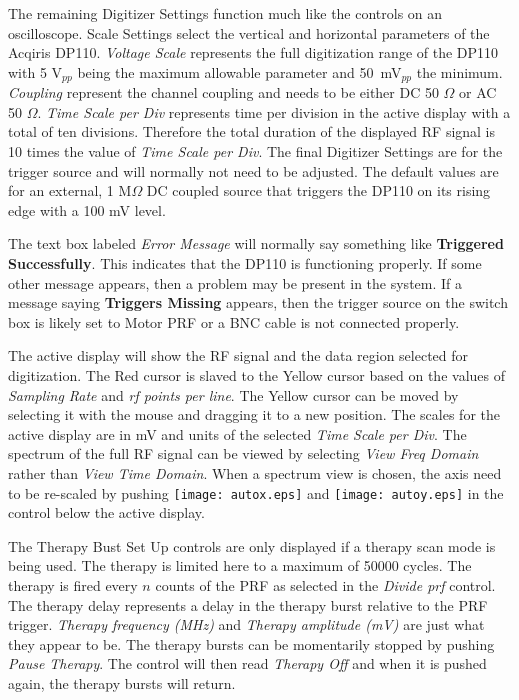 \documentclass[10pt]{article}
\begin{document}
The remaining Digitizer Settings function much like the controls
on an oscilloscope. Scale Settings select the vertical and
horizontal parameters of the Acqiris DP110. {\it Voltage Scale}
represents the full digitization range of the DP110 with 5
V$_{pp}$ being the maximum allowable parameter and 50~mV$_{pp}$
the minimum. {\it Coupling} represent the channel coupling and
needs to be either DC 50 $\Omega$ or AC 50 $\Omega$. {\it Time
Scale per Div} represents time per division in the active display
with a total of ten divisions. Therefore the total duration of the
displayed RF signal is 10 times the value of {\it Time Scale per
Div}. The final Digitizer Settings are for the trigger source and
will normally not need to be adjusted. The default values are for
an external, 1 M$\Omega$ DC coupled source that triggers the DP110
on its rising edge with a 100 mV level.

The text box labeled {\it Error Message} will normally say
something like {\bf Triggered Successfully}. This indicates that
the DP110 is functioning properly. If some other message appears,
then a problem may be present in the system. If a message saying
{\bf Triggers Missing} appears, then the trigger source on the
switch box is likely set to Motor PRF or a BNC cable is not
connected properly.

The active display will show the RF signal and the data region
selected for digitization. The Red cursor is slaved to the Yellow
cursor based on the values of {\it Sampling Rate} and {\it rf
points per line}. The Yellow cursor can be moved by selecting it
with the mouse and dragging it to a new position. The scales for
the active display are in mV and units of the selected {\it Time
Scale per Div}. The spectrum of the full RF signal can be viewed
by selecting {\it View Freq Domain} rather than {\it View Time
Domain}. When a spectrum view is chosen, the axis need to be
re-scaled by pushing \texttt{[image: autox.eps]} and
\texttt{[image: autoy.eps]} in the control below the active
display.

The Therapy Bust Set Up controls are only displayed if a therapy
scan mode is being used. The therapy is limited here to a maximum
of 50000 cycles. The therapy is fired every $n$ counts of the PRF
as selected in the {\it Divide prf} control. The therapy delay
represents a delay in the therapy burst relative to the PRF
trigger. {\it Therapy frequency (MHz)} and {\it Therapy amplitude
(mV)} are just what they appear to be. The therapy bursts can be
momentarily stopped by pushing {\it Pause Therapy}. The control
will then read {\it Therapy Off} and when it is pushed again, the
therapy bursts will return.
\end{document}

